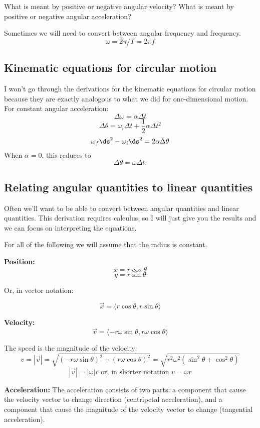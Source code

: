 What is meant by positive or negative angular velocity? What is meant by positive or negative angular acceleration?

Sometimes we will need to convert between angular frequency and frequency.
$$\omega=2\pi/T=2\pi f$$
 
\subsection*{Kinematic equations for circular motion}
I won't go through the derivations for the kinematic equations for circular motion because they are exactly analogous to what we did for one-dimensional motion. For constant angular acceleration:
$$\Delta\omega=\alpha\Delta{t}$$
$$\Delta\theta=\omega_i\Delta{t}+\frac{1}{2}\alpha\Delta{t}^2$$
$$\omega_f\ds^2-\omega_i\ds^2=2\alpha\Delta\theta$$
When $\alpha=0$, this reduces to
$$\Delta\theta=\omega\Delta{t}.$$

\subsection*{Relating angular quantities to linear quantities}
Often we'll want to be able to convert between angular quantities and linear quantities. This derivation requires calculus, so I will just give you the results and we can focus on interpreting the equations.

For all of the following we will assume that the radius is constant.

\textbf{Position:}
$$x=r\cos\theta$$
$$y=r\sin\theta$$

Or, in vector notation:

$$\boxed{\vec x=\langle{r\cos\theta,r\sin\theta}\rangle}$$

\textbf{Velocity:}
$$\boxed{\vec{v}=\langle{-r\omega\sin\theta,r\omega\cos\theta}\rangle}$$

The speed is the magnitude of the velocity:
$$v=|\vec{v}|=\sqrt{(-r\omega\sin\theta)^2+(r\omega\cos\theta)^2}=\sqrt{r^2\omega^2(\sin^2\theta+\cos^2\theta)}$$
$$\boxed{|\vec{v}|=|\omega| r} \mbox{ or, in shorter notation } \boxed{v=\omega r}$$

\vspace{5cm}

\textbf{Acceleration:}
The acceleration consists of two parts: a component that cause the velocity vector to change direction (centripetal acceleration), and a component that cause the magnitude of the velocity vector to change (tangential acceleration).

